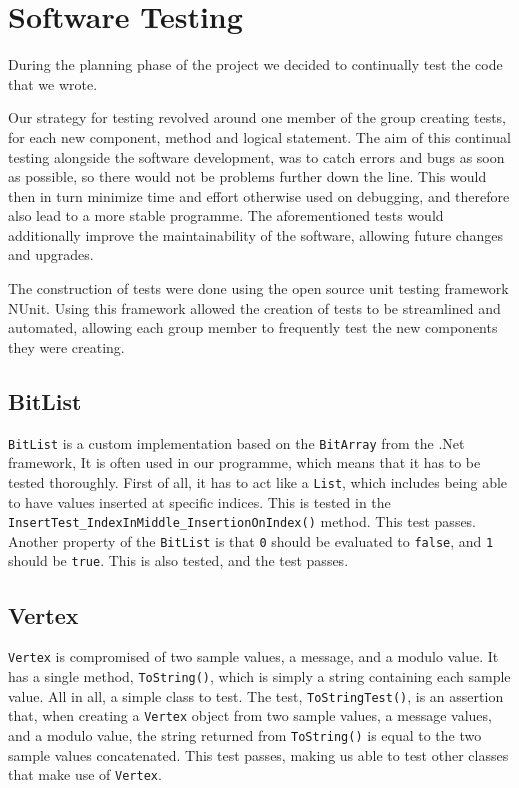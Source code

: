 \section{Software Testing}
During the planning phase of the project we decided to continually test the code that we wrote.

Our strategy for testing revolved around one member of the group creating tests, for each new component, method and logical statement.
The aim of this continual testing alongside the software development, was to catch errors and bugs as soon as possible, so there would not be problems further down the line.
This would then in turn minimize time and effort otherwise used on debugging, and therefore also lead to a more stable programme.
The aforementioned tests would additionally improve the maintainability of the software, allowing future changes and upgrades.

The construction of tests were done using the open source unit testing framework NUnit.
Using this framework allowed the creation of tests to be streamlined and automated, allowing each group member to frequently test the new components they were creating.

\subsection{BitList}
\lstinline|BitList| is a custom implementation based on the \lstinline|BitArray| from the .Net framework, 
It is often used in our programme, which means that it has to be tested thoroughly.
First of all, it has to act like a \lstinline|List|, which includes being able to have values inserted at specific indices.
This is tested in the \lstinline|InsertTest_IndexInMiddle_InsertionOnIndex()| method.
This test passes.\\
Another property of the \lstinline|BitList| is that \lstinline|0| should be evaluated to \lstinline|false|, and \lstinline|1| should be \lstinline|true|.
This is also tested, and the test passes.

\subsection{Vertex}
\lstinline|Vertex| is compromised of two sample values, a message, and a modulo value.
It has a single method, \lstinline|ToString()|, which is simply a string containing each sample value.
All in all, a simple class to test.
The test, \lstinline|ToStringTest()|, is an assertion that, when creating a \lstinline|Vertex| object from two sample values, a message values, and a modulo value, the string returned from \lstinline|ToString()| is equal to the two sample values concatenated.
This test passes, making us able to test other classes that make use of \lstinline|Vertex|.

